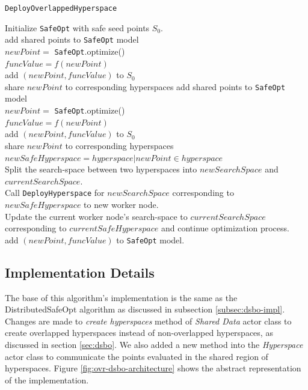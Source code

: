 \begin{algorithm}
	\caption{\texttt{DeployOverlappedHyperspace}}
	\label{alg:deployovrhs}
	Initialize \texttt{SafeOpt} with safe seed points $S_0$.\\
	{
		{
			add shared points to \texttt{SafeOpt} model\\
			$newPoint=$ \texttt{SafeOpt}.optimize()\\
			$funcValue=f(newPoint)$\\
			add $(newPoint,funcValue)$ to $S_0$\\
			{
				share $newPoint$ to corresponding hyperspaces
			}
		}
		\KwRet{}
	}
	{
		add shared points to \texttt{SafeOpt} model\\
		$newPoint=$ \texttt{SafeOpt}.optimize()\\
		$funcValue=f(newPoint)$\\
		add $(newPoint,funcValue)$ to $S_0$\\
		{
			share $newPoint$ to corresponding hyperspaces
		}
		$newSafeHyperspace = hyperspace | newPoint \in hyperspace$\\
		{
			Split the search-space between two hyperspaces into $newSearchSpace$ and $currentSearchSpace$.\\
			Call \texttt{DeployHyperspace} for $newSearchSpace$ corresponding to $newSafeHyperspace$ to new worker node.\\
			Update the current worker node's search-space to $currentSearchSpace$ corresponding to $currentSafeHyperspace$ and continue optimization process.\\
		}
		{
			add $(newPoint,funcValue)$ to \texttt{SafeOpt} model.\\
		}
	}
\end{algorithm}

\subsection{Implementation Details}\label{subsec:ovr-dsbo-impl}
The base of this algorithm's implementation is the same as the DistributedSafeOpt algorithm as discussed in subsection \ref{subsec:dsbo-impl}. Changes are made to \textit{create hyperspaces} method of \textit{Shared Data} actor class to create overlapped hyperspaces instead of non-overlapped hyperspaces, as discussed in section \ref{sec:dsbo}. We also added a new method into the \textit{Hyperspace} actor class to communicate the points evaluated in the shared region of hyperspaces. Figure \ref{fig:ovr-dsbo-architecture} shows the abstract representation of the implementation.

